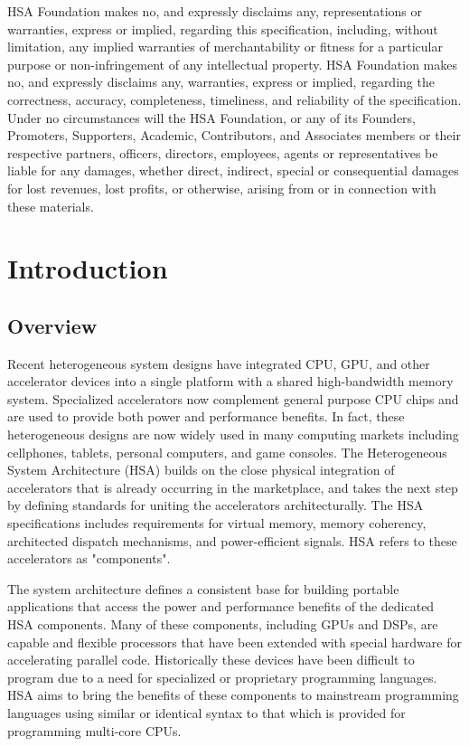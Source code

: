 \documentclass[final]{book}
\begin{document}
HSA Foundation makes no, and expressly disclaims any, representations or
warranties, express or implied, regarding this specification, including, without
limitation, any implied warranties of merchantability or fitness for a
particular purpose or non-infringement of any intellectual property. HSA
Foundation makes no, and expressly disclaims any, warranties, express or
implied, regarding the correctness, accuracy, completeness, timeliness, and
reliability of the specification. Under no circumstances will the HSA
Foundation, or any of its Founders, Promoters, Supporters, Academic,
Contributors, and Associates members or their respective partners, officers,
directors, employees, agents or representatives be liable for any damages,
whether direct, indirect, special or consequential damages for lost revenues,
lost profits, or otherwise, arising from or in connection with these materials.

\clearpage {}
\tableofcontents
\clearpage

\setcounter{page}{1}

\chapter{Introduction} \label{index}\hypertarget{index}{}
\hypertarget{overview}{}\section{Overview}\label{overview}

Recent heterogeneous system designs have integrated CPU, GPU, and other
accelerator devices into a single platform with a shared high-bandwidth memory
system.  Specialized accelerators now complement general purpose CPU chips and
are used to provide both power and performance benefits.  In fact, these
heterogeneous designs are now widely used in many computing markets including
cellphones, tablets, personal computers, and game consoles. The Heterogeneous
System Architecture (HSA) builds on the close physical integration of
accelerators that is already occurring in the marketplace, and takes the next
step by defining standards for uniting the accelerators architecturally. The HSA
specifications includes requirements for virtual memory, memory coherency,
architected dispatch mechanisms, and power-efficient signals. HSA refers to
these accelerators as "components".

The system architecture defines a consistent base for building portable
applications that access the power and performance benefits of the dedicated HSA
components. Many of these components, including GPUs and DSPs, are capable and
flexible processors that have been extended with special hardware for
accelerating parallel code. Historically these devices have been difficult to
program due to a need for specialized or proprietary programming languages. HSA
aims to bring the benefits of these components to mainstream programming
languages using similar or identical syntax to that which is provided for
programming multi-core CPUs.
\end{document}
